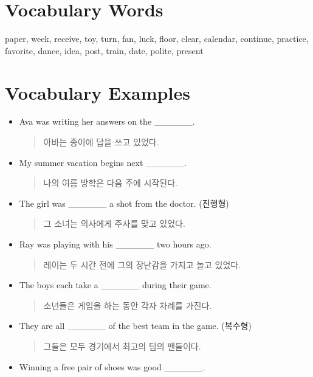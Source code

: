 \documentclass{article}
\begin{document}
\renewcommand{\familydefault}{\sfdefault}
\onehalfspacing
\fontsize{12pt}{14pt}\selectfont

\section*{Vocabulary Words}
\begin{addmargin}[1em]{1em}
paper, week, receive, toy, turn, fan, luck, floor, clear, calendar, continue, practice, favorite, dance, idea, post, train, date, polite, present
\end{addmargin}

\section*{Vocabulary Examples}
\begin{addmargin}[1em]{1em}
\begin{itemize}
    \item Ava was writing her answers on the \_\_\_\_\_\_.
    \begin{quote}
    아바는 종이에 답을 쓰고 있었다.
    \end{quote}
    \item My summer vacation begins next \_\_\_\_\_\_.
    \begin{quote}
    나의 여름 방학은 다음 주에 시작된다.
    \end{quote}
    \item The girl was \_\_\_\_\_\_ a shot from the doctor. (진행형)
    \begin{quote}
    그 소녀는 의사에게 주사를 맞고 있었다.
    \end{quote}
    \item Ray was playing with his \_\_\_\_\_\_ two hours ago.
    \begin{quote}
    레이는 두 시간 전에 그의 장난감을 가지고 놀고 있었다.
    \end{quote}
    \item The boys each take a \_\_\_\_\_\_ during their game.
    \begin{quote}
    소년들은 게임을 하는 동안 각자 차례를 가진다.
    \end{quote}
    \item They are all \_\_\_\_\_\_ of the best team in the game. (복수형)
    \begin{quote}
    그들은 모두 경기에서 최고의 팀의 팬들이다.
    \end{quote}
    \item Winning a free pair of shoes was good \_\_\_\_\_\_.

\end{itemize}
\end{addmargin}
\end{document}
